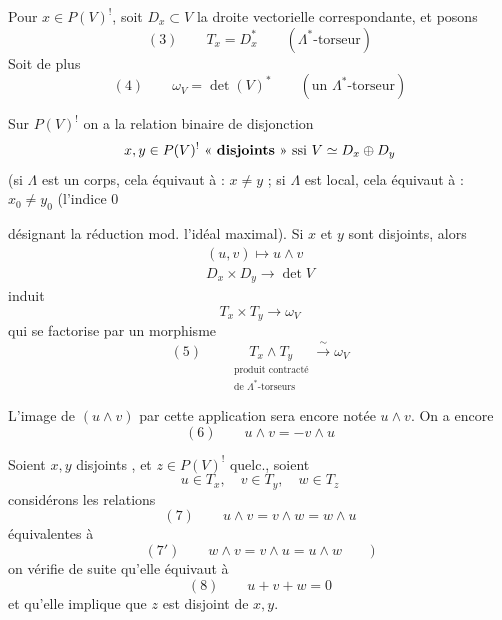 \documentclass[11pt,a4paper]{article}
\begin{document}
Pour $x \in P(V)^!$, soit $D_x \subset V$ la droite vectorielle correspondante,
et posons
\[
  (3) \qquad T_x = D_x^{*} \qquad (\Lambda^{*}\text{-torseur})
\]
Soit de plus
\[
  (4) \qquad \omega_V = \det(V)^{*} \qquad (\text{un } \Lambda^{*}\text{-torseur})
\]

Sur $P(V)^!$ on a la relation binaire de disjonction
\[
  x, y \in P(V)^! \ \text{« \textbf{disjoints} »} \ \text{ssi} \ V \simeq D_x \oplus D_y
\]
(si $\Lambda$ est un corps, cela équivaut à : $x \neq y$ ; si $\Lambda$ est
local, cela équivaut à : $x_0 \neq y_0$ (l'indice $0$


désignant la réduction mod. l'idéal maximal). Si $x$ et $y$ sont disjoints,
alors  
\[
  \begin{array}{c}
    (u, v) \longmapsto u \wedge v \\
    D_x \times D_y \longrightarrow \det V
  \end{array}
\]
induit
\[
  T_x \times T_y \longrightarrow \omega_V
\]
qui se factorise par un morphisme
\[
  (5) \qquad
  \underset{\substack{\text{produit contracté} \\ \text{de } \Lambda^{*}\text{-torseurs}}}{T_x \wedge T_y}
  \xrightarrow{\ \sim\ } \omega_V
\]

 L'image de $(u \wedge v)$  par cette
application sera encore notée $u \wedge v$. On a encore
\[
  (6) \qquad u \wedge v = - v \wedge u
\]

Soient $x, y$ disjoints , et $z \in P(V)^!$ quelc., soient
\[
  u \in T_x, \quad v \in T_y, \quad w \in T_z
\]
considérons les relations
\[
  (7) \qquad u \wedge v = v \wedge w = w \wedge u
\]
équivalentes à
\[
  (7') \qquad w \wedge v = v \wedge u = u \wedge w \qquad )
\]
on vérifie de suite qu'elle équivaut à
\[
  (8) \qquad u + v + w = 0
\]
et qu'elle implique que $z$ est disjoint de $x, y$.

\end{document}
